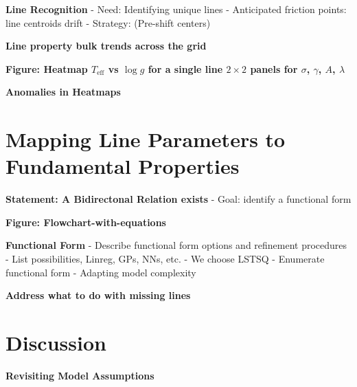 \documentclass[twocolumn]{aastex631}
\begin{document}
\begin{mdframed}
    \textbf{Line Recognition}
    - Need: Identifying unique lines
    - Anticipated friction points: line centroids drift
    - Strategy: (Pre-shift centers)
    \textcolor{lightgray}{\blindtext}
\end{mdframed}

\begin{mdframed}
    \textbf{Line property bulk trends across the grid}
    \textcolor{lightgray}{\blindtext}
\end{mdframed}

\begin{mdframed}
    \textbf{Figure: Heatmap $T_\mathrm{eff}$ vs $\log{g}$ for a single line $2\times2$ panels for $\sigma$, $\gamma$, $A$, $\lambda$ }
\end{mdframed}

\begin{mdframed}
    \textbf{Anomalies in Heatmaps}
    \textcolor{lightgray}{\blindtext}
\end{mdframed}

\section{Mapping Line Parameters to Fundamental Properties}
\begin{mdframed}
    \textbf{Statement: A Bidirectonal Relation exists}
    - Goal: identify a functional form
    \textcolor{lightgray}{\blindtext}
\end{mdframed}

\begin{mdframed}
    \textbf{Figure: Flowchart-with-equations}
\end{mdframed}

\begin{mdframed}
    \textbf{Functional Form}
    - Describe functional form options and refinement procedures
    - List possibilities, Linreg, GPs, NNs, etc.
    - We choose LSTSQ
    - Enumerate functional form
    - Adapting model complexity
    \textcolor{lightgray}{\blindtext}
\end{mdframed}

\begin{mdframed}
    \textbf{Address what to do with missing lines}
    \textcolor{lightgray}{\blindtext}
\end{mdframed}


\section{Discussion}
\begin{mdframed}
    \textbf{Revisiting Model Assumptions}

    \textcolor{lightgray}{\blindtext}
\end{mdframed}
\end{document}

